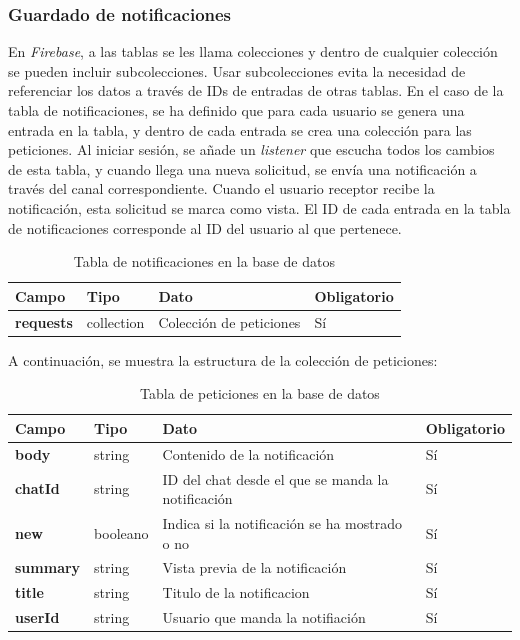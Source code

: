 \documentclass[a4paper, 12pt]{article}
\begin{document}
\subsubsection{Guardado de notificaciones}

En \textit{Firebase}, a las tablas se les llama colecciones y dentro de cualquier colección se pueden incluir subcolecciones. Usar subcolecciones evita la necesidad de referenciar los datos a través de IDs de entradas de otras tablas. En el caso de la tabla de notificaciones, se ha definido que para cada usuario se genera una entrada en la tabla, y dentro de cada entrada se crea una colección para las peticiones. Al iniciar sesión, se añade un \textit{listener} que escucha todos los cambios de esta tabla, y cuando llega una nueva solicitud, se envía una notificación a través del canal correspondiente. Cuando el usuario receptor recibe la notificación, esta solicitud se marca como vista. El ID de cada entrada en la tabla de notificaciones corresponde al ID del usuario al que pertenece.

\begin{table}[H]
\label{tab:notifications}
	\begin{tabular}{|m{3.2cm}|m{2cm}|m{5cm}|m{3cm}|}
	\hline
	\textbf{Campo} & \textbf{Tipo} & \textbf{Dato} & \textbf{Obligatorio} \\ 
	\hline
	\textbf{requests} & collection & Colección de peticiones &  Sí \\ 
	\hline
	\end{tabular}
\caption{Tabla de notificaciones en la base de datos}
\end{table}

A continuación, se muestra la estructura de la colección de peticiones:

\begin{table}[H]
\label{tab:users}
	\begin{tabular}{|m{3.2cm}|m{2cm}|m{5cm}|m{3cm}|}
	\hline
	\textbf{Campo} & \textbf{Tipo} & \textbf{Dato} & \textbf{Obligatorio} \\ 
	\hline
	\textbf{body} & string & Contenido de la notificación &  Sí \\ 
	\hline
	\textbf{chatId} & string &  ID del chat desde el que se manda la notificación &  Sí \\ 
	\hline
	\textbf{new} & booleano & Indica si la notificación se ha mostrado o no &  Sí \\ 
	\hline
	\textbf{summary} & string & Vista previa de la notificación &  Sí \\ 
	\hline
	\textbf{title} & string & Titulo de la notificacion &  Sí \\ 
	\hline
	\textbf{userId} & string & Usuario que manda la notifiación &  Sí \\ 
	\hline
	\end{tabular}
\caption{Tabla de peticiones en la base de datos}
\end{table}
\end{document}
